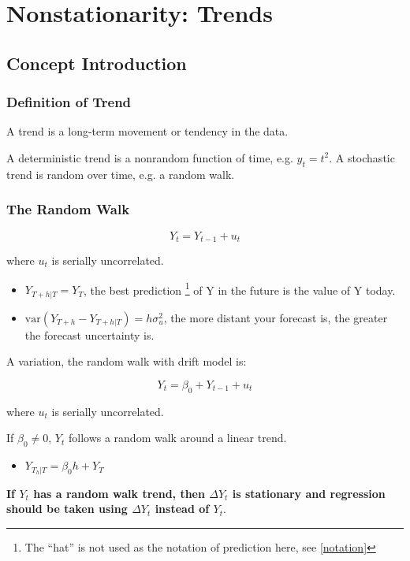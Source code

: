 \documentclass{article}
\begin{document}
\section{Nonstationarity: Trends}

\subsection{Concept Introduction}

\subsubsection{Definition of Trend}

A trend is a long-term movement or tendency in the data.

A deterministic trend is a nonrandom function of time, e.g. $y_t = t^2$.
A stochastic trend is random over time, e.g. a random walk.

\subsubsection{The Random Walk}

\[
	Y_t = Y_{t-1} + u_t
\]

where $u_t$ is serially uncorrelated.

\begin{itemize}
	\item $Y_{T+h|T} = Y_T$, the best prediction
					\footnote{The ``hat'' is not used as the notation of prediction here, see \ref{notation}}
					of Y in the future is the value of Y today.
	\item $\text{var}(Y_{T+h} - Y_{T+h|T}) = h \sigma_u^2$, the more distant your forecast is,
					the greater the forecast uncertainty is.
\end{itemize}

A variation, the random walk with drift model is:

\[
	Y_t = \beta_0 + Y_{t-1} + u_t
\]

where $u_t$ is serially uncorrelated.

If $\beta_0 \neq 0$, $Y_t$ follows a random walk around a linear trend.

\begin{itemize}
	\item $Y_{T_h|T} = \beta_0 h + Y_T$
\end{itemize}

\textbf{
	If $Y_t$ has a random walk trend, then $\Delta Y_t$ is stationary and regression
	should be taken using $\Delta Y_t$ instead of $Y_t.$
}
\end{document}
